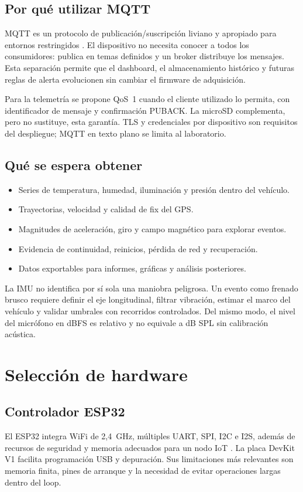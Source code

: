 \documentclass[11pt,a4paper,oneside]{report}
\begin{document}
\section{Por qué utilizar MQTT}
MQTT es un protocolo de publicación/suscripción liviano y apropiado para entornos
restringidos \cite{mqtt}. El dispositivo no necesita conocer a todos los consumidores:
publica en temas definidos y un broker distribuye los mensajes. Esta separación
permite que el dashboard, el almacenamiento histórico y futuras reglas de alerta
evolucionen sin cambiar el firmware de adquisición.

Para la telemetría se propone QoS~1 cuando el cliente utilizado lo permita, con
identificador de mensaje y confirmación PUBACK. La microSD complementa, pero no
sustituye, esta garantía. TLS y credenciales por dispositivo son requisitos del
despliegue; MQTT en texto plano se limita al laboratorio.

\section{Qué se espera obtener}
\begin{itemize}
  \item Series de temperatura, humedad, iluminación y presión dentro del vehículo.
  \item Trayectorias, velocidad y calidad de fix del GPS.
  \item Magnitudes de aceleración, giro y campo magnético para explorar eventos.
  \item Evidencia de continuidad, reinicios, pérdida de red y recuperación.
  \item Datos exportables para informes, gráficas y análisis posteriores.
\end{itemize}

La IMU no identifica por sí sola una maniobra peligrosa. Un evento como frenado brusco
requiere definir el eje longitudinal, filtrar vibración, estimar el marco del vehículo
y validar umbrales con recorridos controlados. Del mismo modo, el nivel del micrófono
en dBFS es relativo y no equivale a dB SPL sin calibración acústica.

\chapter{Selección de hardware}

\section{Controlador ESP32}
El ESP32 integra WiFi de 2,4~GHz, múltiples UART, SPI, I2C e I2S, además de recursos
de seguridad y memoria adecuados para un nodo IoT \cite{esp32}. La placa DevKit V1
facilita programación USB y depuración. Sus limitaciones más relevantes son memoria
finita, pines de arranque y la necesidad de evitar operaciones largas dentro del loop.
\end{document}
